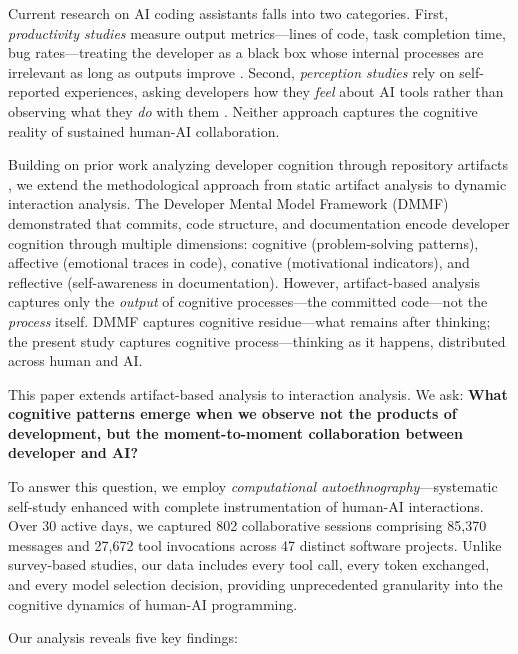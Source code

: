 \documentclass{ntlabs-preprint}
\begin{document}
Current research on AI coding assistants falls into two categories. First, \textit{productivity studies} measure output metrics---lines of code, task completion time, bug rates---treating the developer as a black box whose internal processes are irrelevant as long as outputs improve \citep{peng2023impact}. Second, \textit{perception studies} rely on self-reported experiences, asking developers how they \textit{feel} about AI tools rather than observing what they \textit{do} with them \citep{barke2023grounded}. Neither approach captures the cognitive reality of sustained human-AI collaboration.

Building on prior work analyzing developer cognition through repository artifacts \citep{silva2025dmmf}, we extend the methodological approach from static artifact analysis to dynamic interaction analysis. The Developer Mental Model Framework (DMMF) demonstrated that commits, code structure, and documentation encode developer cognition through multiple dimensions: cognitive (problem-solving patterns), affective (emotional traces in code), conative (motivational indicators), and reflective (self-awareness in documentation). However, artifact-based analysis captures only the \textit{output} of cognitive processes---the committed code---not the \textit{process} itself. DMMF captures cognitive residue---what remains after thinking; the present study captures cognitive process---thinking as it happens, distributed across human and AI.

This paper extends artifact-based analysis to interaction analysis. We ask: \textbf{What cognitive patterns emerge when we observe not the products of development, but the moment-to-moment collaboration between developer and AI?}

To answer this question, we employ \textit{computational autoethnography}---systematic self-study enhanced with complete instrumentation of human-AI interactions. Over 30 active days, we captured 802 collaborative sessions comprising 85,370 messages and 27,672 tool invocations across 47 distinct software projects. Unlike survey-based studies, our data includes every tool call, every token exchanged, and every model selection decision, providing unprecedented granularity into the cognitive dynamics of human-AI programming.

Our analysis reveals five key findings:
\end{document}
